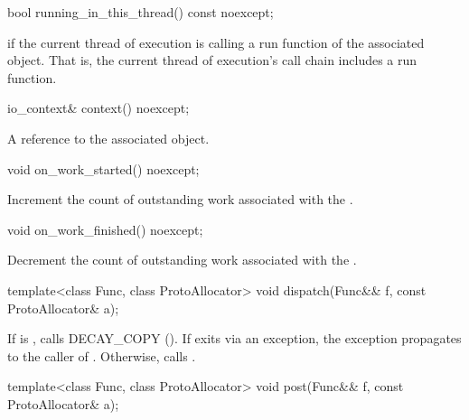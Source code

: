 \begin{itemdecl}
bool running_in_this_thread() const noexcept;
\end{itemdecl}

\begin{itemdescr}
\pnum
\returns {} if the current thread of execution is calling a run function of the associated  object. \enternote That is, the current thread of execution's call chain includes a run function. \exitnote
\end{itemdescr}

\begin{itemdecl}
io_context& context() noexcept;
\end{itemdecl}

\begin{itemdescr}
\pnum
\returns A reference to the associated  object.
\end{itemdescr}

\begin{itemdecl}
void on_work_started() noexcept;
\end{itemdecl}

\begin{itemdescr}
\pnum
\effects Increment the count of outstanding work associated with the .
\end{itemdescr}

\begin{itemdecl}
void on_work_finished() noexcept;
\end{itemdecl}

\begin{itemdescr}
\pnum
\effects Decrement the count of outstanding work associated with the .
\end{itemdescr}

\begin{itemdecl}
template<class Func, class ProtoAllocator>
  void dispatch(Func&& f, const ProtoAllocator& a);
\end{itemdecl}

\begin{itemdescr}
\pnum
\effects If  is , calls DECAY_COPY (). \enternote If  exits via an exception, the exception propagates to the caller of . \exitnote Otherwise, calls .
\end{itemdescr}

\begin{itemdecl}
template<class Func, class ProtoAllocator>
  void post(Func&& f, const ProtoAllocator& a);
\end{itemdecl}

